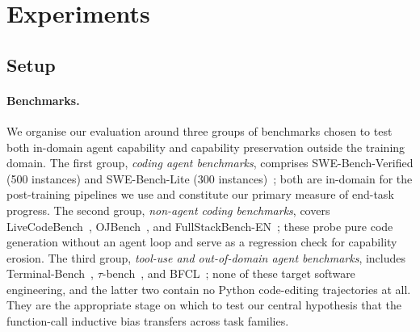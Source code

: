 %

\section{Experiments}
\label{sec:exp}

\subsection{Setup}
\label{sec:exp:setup}

\paragraph{Benchmarks.}
We organise our evaluation around three groups of benchmarks chosen to test
both in-domain agent capability and capability preservation outside the
training domain. The first group, \emph{coding agent benchmarks}, comprises
SWE-Bench-Verified (500 instances) and SWE-Bench-Lite
(300 instances)~\citep{TODO_swebench}; both are in-domain for the
post-training pipelines we use and constitute our primary measure of
end-task progress. The second group, \emph{non-agent coding benchmarks},
covers LiveCodeBench~\citep{TODO_livecodebench}, OJBench~\citep{TODO_ojbench},
and FullStackBench-EN~\citep{TODO_fullstack}; these probe pure code
generation without an agent loop and serve as a regression check for
capability erosion. The third group, \emph{tool-use and out-of-domain agent
benchmarks}, includes Terminal-Bench~\citep{TODO_terminalbench},
$\tau$-bench~\citep{TODO_taubench}, and BFCL~\citep{TODO_bfcl}; none of
these target software engineering, and the latter two contain no Python
code-editing trajectories at all. They are the appropriate stage on which
to test our central hypothesis that the function-call inductive bias
transfers across task families.

